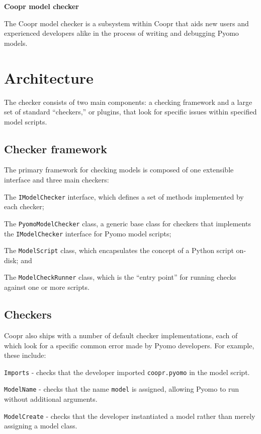 \documentclass{article}
\begin{document}
\begin{center}
{\huge \textbf{Coopr model checker}}
\end{center}

The Coopr model checker is a subsystem within Coopr that aids new users and experienced developers alike in the process of writing and debugging Pyomo models. 

\section*{Architecture}
The checker consists of two main components: a checking framework and a large set of standard ``checkers,'' or plugins, that look for specific issues within specified model scripts.

\subsection*{Checker framework}
The primary framework for checking models is composed of one extensible interface and three main checkers:

\begin{itemize*}
\item The \verb!IModelChecker! interface, which defines a set of methods implemented by each checker;
\item The \verb!PyomoModelChecker! class, a generic base class for checkers that implements the \verb!IModelChecker! interface for Pyomo model scripts;
\item The \verb!ModelScript! class, which encapsulates the concept of a Python script on-disk; and
\item The \verb!ModelCheckRunner! class, which is the ``entry point'' for running checks against one or more scripts.
\end{itemize*}

\subsection*{Checkers}
Coopr also ships with a number of default checker implementations, each of which look for a specific common error made by Pyomo developers. For example, these include:

\begin{itemize*}
\item \verb!Imports! - checks that the developer imported \verb!coopr.pyomo! in the model script.
\item \verb!ModelName! - checks that the name \verb!model! is assigned, allowing Pyomo to run without additional arguments.
\item \verb!ModelCreate! - checks that the developer instantiated a model rather than merely assigning a model class.
\end{itemize*}
\end{document}
